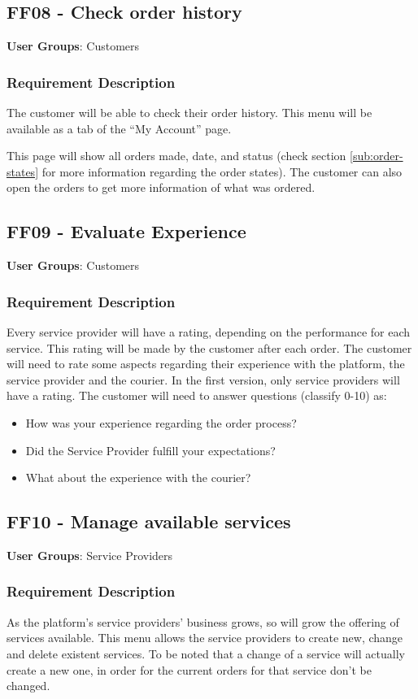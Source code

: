 \subsection{FF08 - Check order history}
\textbf{User Groups}: Customers

\subsubsection{Requirement Description}
The customer will be able to check their order history. This menu will be available as a tab of the “My Account” page.
\par
This page will show all orders made, date, and status (check section \ref{sub:order-states} for more information regarding the order states). The customer can also open the orders to get more information of what was ordered.


\subsection{FF09 - Evaluate Experience}
\textbf{User Groups}: Customers

\subsubsection{Requirement Description}
Every service provider will have a rating, depending on the performance for each service. This rating will be made by the customer after each order. The customer will need to rate some aspects regarding their experience with the platform, the service provider and the courier. In the first version, only service providers will have a rating. The customer will need to answer questions (classify 0-10) as:
\begin{itemize}
    \item How was your experience regarding the order process?
    \item Did the Service Provider fulfill your expectations?
    \item What about the experience with the courier?
\end{itemize}

\subsection{FF10 - Manage available services}
\textbf{User Groups}: Service Providers

\subsubsection{Requirement Description}
As the platform's service providers’ business grows, so will grow the offering of services available. This menu allows the service providers to create new, change and delete existent services. To be noted that a change of a service will actually create a new one, in order for the current orders for that service don't be changed.


